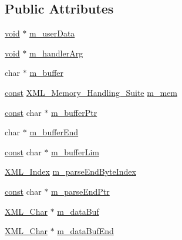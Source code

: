 \subsection*{Public Attributes}
\begin{DoxyCompactItemize}
\item 
\hyperlink{struct_x_m_l___parser_struct_a3cf000bdbc145bf39b502cd6ba0b6bc7}{void} $\ast$ \hyperlink{struct_x_m_l___parser_struct_a4e98dbfd4821f83314dbf98143d9df7d}{m\+\_\+user\+Data}
\item 
\hyperlink{struct_x_m_l___parser_struct_a3cf000bdbc145bf39b502cd6ba0b6bc7}{void} $\ast$ \hyperlink{struct_x_m_l___parser_struct_afff80e1e001253c16d07998981ad0dad}{m\+\_\+handler\+Arg}
\item 
char $\ast$ \hyperlink{struct_x_m_l___parser_struct_a5217c5dc81da5b986c2043a32353ab1a}{m\+\_\+buffer}
\item 
\hyperlink{getopt1_8c_a2c212835823e3c54a8ab6d95c652660e}{const} \hyperlink{struct_x_m_l___memory___handling___suite}{X\+M\+L\+\_\+\+Memory\+\_\+\+Handling\+\_\+\+Suite} \hyperlink{struct_x_m_l___parser_struct_a3d8cf0e7045f47319b423aebd7c1cf67}{m\+\_\+mem}
\item 
\hyperlink{getopt1_8c_a2c212835823e3c54a8ab6d95c652660e}{const} char $\ast$ \hyperlink{struct_x_m_l___parser_struct_adb5c77046a556bc04f3b57033cafbee8}{m\+\_\+buffer\+Ptr}
\item 
char $\ast$ \hyperlink{struct_x_m_l___parser_struct_a0ba4eb2c181cd3915f388e29b5397880}{m\+\_\+buffer\+End}
\item 
\hyperlink{getopt1_8c_a2c212835823e3c54a8ab6d95c652660e}{const} char $\ast$ \hyperlink{struct_x_m_l___parser_struct_ab937e44980d37e6e8aba68e9697560fa}{m\+\_\+buffer\+Lim}
\item 
\hyperlink{amiga_2include_2libraries_2expat_8h_ae2a9a55c7071b0c6da19fea14ce8f504}{X\+M\+L\+\_\+\+Index} \hyperlink{struct_x_m_l___parser_struct_a705969e02cb294b8515a3d8f3d364e0c}{m\+\_\+parse\+End\+Byte\+Index}
\item 
\hyperlink{getopt1_8c_a2c212835823e3c54a8ab6d95c652660e}{const} char $\ast$ \hyperlink{struct_x_m_l___parser_struct_ad7ab968bbbba1f8551e3cbcee6839646}{m\+\_\+parse\+End\+Ptr}
\item 
\hyperlink{amiga_2include_2libraries_2expat_8h_a63da96463e775e1ec3a7d1f076208127}{X\+M\+L\+\_\+\+Char} $\ast$ \hyperlink{struct_x_m_l___parser_struct_a1e4a84577848edcca70b39490fc9579b}{m\+\_\+data\+Buf}
\item 
\hyperlink{amiga_2include_2libraries_2expat_8h_a63da96463e775e1ec3a7d1f076208127}{X\+M\+L\+\_\+\+Char} $\ast$ \hyperlink{struct_x_m_l___parser_struct_aed8dc0bdbeb4c93842d762624c61902f}{m\+\_\+data\+Buf\+End}

\end{DoxyCompactItemize}
